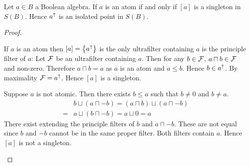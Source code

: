 \begin{prop}
    Let $a \in B$ a Boolean algebra.
    If $a$ is an atom if and only if $[a]$ is a singleton in $S(B)$.
    Hence $a^{\uparrow}$ is an isolated point in $S(B)$.
\end{prop}
\begin{proof}
    \begin{forward}
        If $a$ is an atom then $[a] = \left\{a^{\uparrow}\right\}$ is the only ultrafilter 
        containing $a$ is the principle filter of $a$:
        Let $\mathcal{F}$ be an ultrafilter containing $a$.
        Then for any $b \in \mathcal{F}$, 
        $a \sqcap b \in \mathcal{F}$ and non-zero.
        Therefore $a \sqcap b = a$ as $a$ is an atom and $a \leq b$.
        Hence $b \in a^{\uparrow}$.
        By maximality $\mathcal{F} = a^{\uparrow}$.
        Hence $[a]$ is a singleton.
    \end{forward}

    \begin{backward}
        Suppose $a$ is not atomic. 
        Then there exists $b \leq a$ such that $b \ne 0$ and $b \ne a$.
        \begin{align*}
            & b \sqcup (a \sqcap - b)
            = (a \sqcap b) \sqcup (a \sqcap - b)\\
            = & a \sqcup (b \sqcap - b) = a \sqcup 0 = a
        \end{align*}
        There exist  
        extending the principle filters of $b$ and 
        $a \sqcap - b$.
        These are not equal since $b$ and $- b$ cannot be in the same 
        proper filter.
        Both filters contain $a$. 
        Hence $[a]$ is not a singleton.
    \end{backward}
\end{proof}